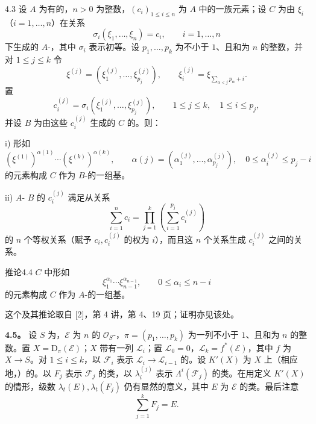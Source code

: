 \begin{SGAresult}{}{4.3}
设 $A$ 为有的，$n>0$ 为整数，$(c_i)_{1\leq i\leq n}$ 为 $A$ 中的一族元素；设 $C$ 为由 $\xi_i$（$i=1,\ldots,n$）在关系
\[
\sigma_i(\xi_1,\ldots,\xi_n)=c_i,\qquad i=1,\ldots,n
\]
下生成的 $A$-，其中 $\sigma_i$ 表示初等。设 $p_1,\ldots,p_k$ 为不小于 $1$、且和为 $n$ 的整数，并对 $1\leq j\leq k$ 令
\[
\xi^{(j)}=(\xi_1^{(j)},\ldots,\xi_{p_j}^{(j)}),\qquad
\xi_i^{(j)}=\xi_{\sum_{\alpha<j}p_\alpha+i}.
\]
置
\[
c_i^{(j)}=\sigma_i(\xi_1^{(j)},\ldots,\xi_{p_j}^{(j)}),\qquad
1\leq j\leq k,\quad 1\leq i\leq p_j,
\]
并设 $B$ 为由这些 $c_i^{(j)}$ 生成的 $C$ 的。则：

\textup{i)} 形如
\[
(\xi^{(1)})^{\alpha(1)}\cdots(\xi^{(k)})^{\alpha(k)},
\qquad
\alpha(j)=(\alpha_1^{(j)},\ldots,\alpha_{p_j}^{(j)}),\quad
0\leq\alpha_i^{(j)}\leq p_j-i
\]
的元素构成 $C$ 作为 $B$-的一组基。

\textup{ii)} $A$- $B$ 的 $c_i^{(j)}$ 满足从关系
\[
\sum_{i=1}^n c_i=\prod_{j=1}^k\left(\sum_{i=1}^{p_j}c_i^{(j)}\right)
\]
的 $n$ 个等权关系（赋予 $c_i,c_i^{(j)}$ 的权为 $i$），而且这 $n$ 个关系生成 $c_i^{(j)}$ 之间的关系。
\end{SGAresult}
\begin{SGAresult}{推论}{4.4}
$C$ 中形如
\[
\xi_1^{\alpha_1}\cdots\xi_{n-1}^{\alpha_{n-1}},\qquad 0\leq\alpha_i\leq n-i
\]
的元素构成 $C$ 作为 $A$-的一组基。
\end{SGAresult}

这个及其推论取自 [2]，第 4 讲，第 4、19 页；证明亦见该处。

\textbf{4.5。} 设 $S$ 为，$\mathcal E$ 为 $n$ 的 $\mathcal O_S$-，$\pi=(p_1,\ldots,p_k)$ 为一列不小于 $1$、且和为 $n$ 的整数。置 $X=\mathrm D_\pi(\mathcal E)$；$X$ 带有一列 $\mathcal L_i$；置 $\mathcal L_0=0$，$\mathcal L_k=f^*(\mathcal E)$，其中 $f$ 为 $X\longrightarrow S$。对 $1\leq i\leq k$，以 $\mathcal F_i$ 表示 $\mathcal L_i\longrightarrow\mathcal L_{i-1}$ 的。设 $K'(X)$ 为 $X$ 上（相应地，）的。以 $F_j$ 表示 $\mathcal F_j$ 的类，以 $\lambda_i^{(j)}$ 表示 $\Lambda^i(\mathcal F_j)$ 的类。在用定义 $K'(X)$ 的情形，级数 $\lambda_t(E),\lambda_t(F_j)$ 仍有显然的意义，其中 $E$ 为 $\mathcal E$ 的类。最后注意
\[
\sum_{j=1}^k F_j=E.
\]

